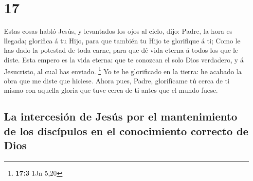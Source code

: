 \hypertarget{section-16}{%
\section{17}\label{section-16}}

 Estas cosas habló Jesús, y levantados los ojos al cielo,
dijo: Padre, la hora es llegada; glorifica á tu Hijo, para que también
tu Hijo te glorifique á ti;  Como le has dado la potestad
de toda carne, para que dé vida eterna á todos los que le diste.
 Esta empero es la vida eterna: que te conozcan el solo
Dios verdadero, y á Jesucristo, al cual has enviado. \footnote{\textbf{17:3}
  1Jn 5,20}  Yo te he glorificado en la tierra: he acabado
la obra que me diste que hiciese.  Ahora pues, Padre,
glorifícame tú cerca de ti mismo con aquella gloria que tuve cerca de ti
antes que el mundo fuese.

\hypertarget{la-intercesiuxf3n-de-jesuxfas-por-el-mantenimiento-de-los-discuxedpulos-en-el-conocimiento-correcto-de-dios}{%
\subsection{La intercesión de Jesús por el mantenimiento de los
discípulos en el conocimiento correcto de
Dios}\label{la-intercesiuxf3n-de-jesuxfas-por-el-mantenimiento-de-los-discuxedpulos-en-el-conocimiento-correcto-de-dios}}

